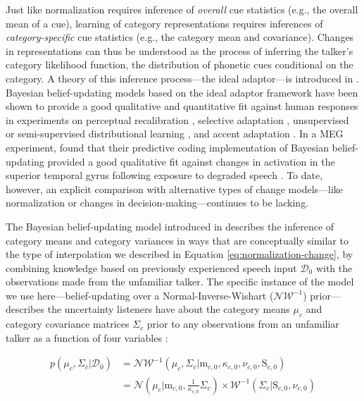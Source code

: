 \documentclass[
  11pt,
  man,floatsintext]{apa6}
\begin{document}
Just like normalization requires inference of \emph{overall} cue statistics (e.g., the overall mean of a cue), learning of category representations requires inferences of \emph{category-specific} cue statistics (e.g., the category mean and covariance). Changes in representations can thus be understood as the process of inferring the talker's category likelihood function, the distribution of phonetic cues conditional on the category. A theory of this inference process---the ideal adaptor---is introduced in \textcite{kleinschmidt-jaeger2015}. Bayesian belief-updating models based on the ideal adaptor framework have been shown to provide a good qualitative and quantitative fit against human responses in experiments on perceptual recalibration \autocites{kleinschmidt-jaeger2011,kleinschmidt-jaeger2012}[for closely related models, see][]{xie2021cognition}, selective adaptation \autocite{kleinschmidt-jaeger2016pbr}, unsupervised or semi-supervised distributional learning \autocites[e.g.,][]{kim2020,kleinschmidt-jaeger2016cogsci,theodore-monto2019}[for closely related model, see][]{bejjanki2011,clayards2008}, and accent adaptation \autocites{hitczenko-feldman2016}[for a closely related model, see][]{tan2021}. In a MEG experiment, \textcite{sohoglu-davis2016} found that their predictive coding implementation of Bayesian belief-updating provided a good qualitative fit against changes in activation in the superior temporal gyrus following exposure to degraded speech \autocite[see also][]{davis-sohoglu2020}. To date, however, an explicit comparison with alternative types of change models---like normalization or changes in decision-making---continues to be lacking.

The Bayesian belief-updating model introduced in \textcite{kleinschmidt-jaeger2015} describes the inference of category means and category variances in ways that are conceptually similar to the type of interpolation we described in Equation \eqref{eq:normalization-change}, by combining knowledge based on previously experienced speech input \(\mathcal{D}_0\) with the observations made from the unfamiliar talker. The specific instance of the model we use here---belief-updating over a Normal-Inverse-Wishart (\(\mathcal{NW^{-1}}\)) prior---describes the uncertainty listeners have about the category means \(\mu_c\) and category covariance matrices \(\Sigma_c\) prior to any observations from an unfamiliar talker as a function of four variables \autocite[p.~132-3]{murphy2012}:

\begin{equation}\label{eq:niw-updating}
\begin{split}
p\left( \mu_c, \Sigma_c | \mathcal{D}_0 \right) & = \mathcal{NW}^{-1} \left( \mu_c, \Sigma_c | \mathrm{m}_{c,0}, \kappa_{c,0}, \nu_{c,0}, \mathrm{S}_{c,0} \right) \\
& = \mathcal{N}\left( \mu_c | \mathrm{m}_{c,0}, \frac{1}{\kappa_{c,0}} \Sigma_{c} \right) \times \mathcal{W}^{-1}\left( \Sigma_c | \mathrm{S}_{c,0}, \nu_{c,0} \right)
\end{split}
\end{equation}
\end{document}

